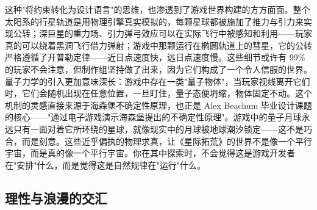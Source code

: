 这种"将约束转化为设计语言"的思维，也渗透到了游戏世界构建的方方面面。整个太阳系的行星轨道是用物理引擎真实模拟的，每颗星球都被施加了推力与引力来实现公转；深巨星的重力场、引力弹弓效应可以在实际飞行中被感知和利用——玩家真的可以绕着黑洞飞行借力弹射；游戏中那颗运行在椭圆轨道上的彗星，它的公转严格遵循了开普勒定律——近日点速度快，远日点速度慢。这些细节或许有 99\% 的玩家不会注意，但制作组坚持做了出来，因为它们构成了一个令人信服的世界。量子力学的引入更加意味深长：游戏中存在一类"量子物体"，当玩家视线离开它们时，它们会随机出现在任意位置，一旦盯住，量子态便坍缩，物体固定不动。这个机制的灵感直接来源于海森堡不确定性原理，也正是 Alex Beachum 毕业设计课题的核心——"通过电子游戏演示海森堡提出的不确定性原理"。游戏中的量子月球永远只有一面对着它所环绕的星球，就像现实中的月球被地球潮汐锁定——这不是巧合，而是刻意。这些近乎偏执的物理求真，让《星际拓荒》的世界不是像一个平行宇宙，而是真的像一个平行宇宙。你在其中探索时，不会觉得这是游戏开发者在"安排"什么，而是觉得这是自然规律在"运行"什么。

\subsection{理性与浪漫的交汇}
